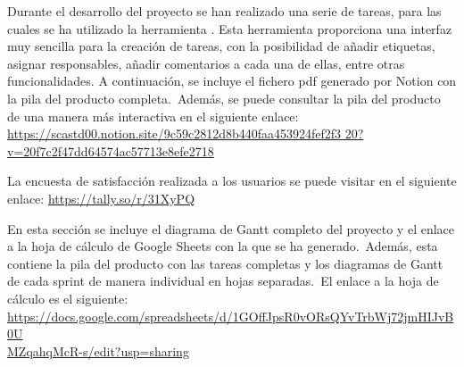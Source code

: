 


Durante el desarrollo del proyecto se han realizado una serie de tareas, para las cuales se ha utilizado la
herramienta .
Esta herramienta proporciona una interfaz muy sencilla para la creación de tareas, con la
posibilidad de añadir etiquetas, asignar responsables, añadir comentarios a cada una de ellas,
entre otras funcionalidades.
A continuación, se incluye el fichero pdf generado por Notion con la pila del producto completa.\ Además, se puede
consultar la pila del producto de una manera más interactiva en el siguiente enlace:
\href{https://scastd00.notion.site/9c59c2812d8b440faa453924fef2f320?v=20f7c2f47dd64574ac57713e8efe2718}
{https://scastd00.notion.site/9c59c2812d8b440faa453924fef2f3
20?v=20f7c2f47dd64574ac57713e8efe2718}

\label{anx:product-backlog-notion}




La encuesta de satisfacción realizada a los usuarios se puede visitar en el siguiente enlace:
\href{https://tally.so/r/31XyPQ}{https://tally.so/r/31XyPQ}
\label{anx:encuesta-satisfaccion}



En esta sección se incluye el diagrama de Gantt completo del proyecto y el enlace a la hoja de cálculo de Google
Sheets con la que se ha generado.\ Además, esta contiene la pila del producto con las tareas completas y los diagramas
de Gantt de cada sprint de manera individual en hojas separadas.\ El enlace a la hoja de cálculo es el siguiente:
\href{https://docs.google.com/spreadsheets/d/1GOffJpsR0vORsQYvTrbWj72jmHIJvB0UMZqahqMcR-s/edit?usp=sharing}
{https://docs.google.com/spreadsheets/d/1GOffJpsR0vORsQYvTrbWj72jmHIJvB0U\\MZqahqMcR-s/edit?usp=sharing}

\label{anx:gantt}

